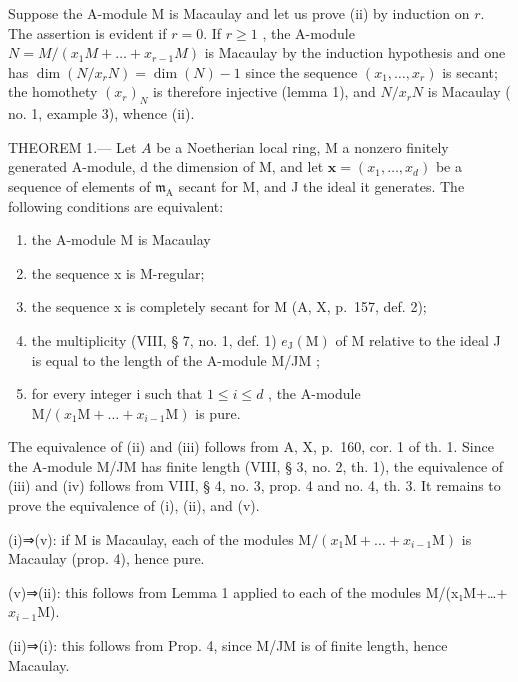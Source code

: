Suppose the A-module M is Macaulay and let us prove (ii) by induction on \(r\). The assertion is evident if \(r = 0\). If \(r \geqslant 1\) , the A-module \(N = M/(x_1M + \ldots + x_{r-1}M)\) is Macaulay by the induction hypothesis and one has \(\dim(N/x_rN) = \dim(N) - 1\) since the sequence \((x_1, \ldots, x_r)\) is secant; the homothety \((x_r)_N\) is therefore injective (lemma 1), and \(N/x_rN\) is Macaulay (\(\mathrm{no.}\) 1, example 3), whence (ii).

THEOREM 1.--- Let \(A\) be a Noetherian local ring, M a nonzero finitely generated A-module, d the dimension of M, and let \(\mathbf{x} = (x_1, \ldots, x_d)\) be a sequence of elements of \(\mathfrak{m}_{\mathrm{A}}\) secant for M, and J the ideal it generates. The following conditions are equivalent:

\begin{enumerate}
\def\labelenumi{(\roman{enumi})}
\item
  the A-module M is Macaulay
\item
  the sequence x is M-regular;
\item
  the sequence x is completely secant for M (A, X, p.~157, def. 2);
\item
  the multiplicity (VIII, § 7, no. 1, def. 1) \(e_{\mathrm{J}}(\mathrm{M})\) of M relative to the ideal J is equal to the length of the A-module M/JM ;
\item
  for every integer i such that \(1 \leqslant i \leqslant d\) , the A-module \(\mathrm{M}/(x_{1}\mathrm{M}+\ldots+x_{i-1}\mathrm{M})\) is pure.
\end{enumerate}

The equivalence of (ii) and (iii) follows from A, X, p.~160, cor. 1 of th. 1. Since the A-module M/JM has finite length (VIII, § 3, no. 2, th. 1), the equivalence of (iii) and (iv) follows from VIII, § 4, no. 3, prop. 4 and no. 4, th. 3. It remains to prove the equivalence of (i), (ii), and (v).

(i)⇒(v): if M is Macaulay, each of the modules \(\mathrm{M}/(x_{1}\mathrm{M}+\ldots+x_{i-1}\mathrm{M})\) is Macaulay (prop. 4), hence pure.

(v)⇒(ii): this follows from Lemma 1 applied to each of the modules M/(x₁M+\ldots+\(x_{i-1}\){}M).

(ii)⇒(i): this follows from Prop. 4, since M/JM is of finite length, hence Macaulay.

